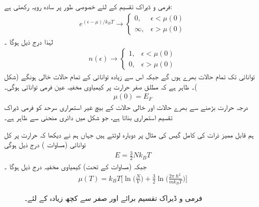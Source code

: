  فرمی و  ڈیراک تقسیم  کے لئے  خصوصی طور پر سادہ رویہ رکھتی ہے: 
\begin{align*}
e^{(\epsilon - \mu)/k_B T} \to
\begin{cases}
0 , & \epsilon < \mu (0) \\
\infty , & \epsilon > \mu (0)
\end{cases}
\end{align*}
لہٰذا درج ذیل ہوگا ۔
\begin{align}
n(\epsilon) \to
\begin{cases}
1, & \epsilon < \mu (0) \\
0, & \epsilon > \mu (0)
\end{cases}
\end{align}
توانائی  تک تمام حالات بھرے ہوں گے جبکہ اس سے زیادہ توانائی کے تمام حالات خالی ہونگے (شکل )۔ ظاہر ہے کہ مطلق صفر حرارت پر کیمیاوی مخفیہ عین فرمی توانائی ہوگی۔ 
\begin{align}
\mu (0) = E_F
\end{align}
درجہ حرارت بڑھنے سے بھرے حالات اور خالی حالات کے بیچ غیر استمراری سرحد کو فرمی ڈیراک تقسیم استمراری بناتا ہے،  جو  شکل   میں دائری منحنی سے ظاہر ہے۔   

ہم قابل ممیز ذرات کی کامل گیس کی مثال پر دوبارہ لوٹتے ہیں جہاں ہم نے دیکھا کہ حرارت  پر کل توانائی  (مساوات  )   درج ذیل ہوگی 
\begin{align}
E = \frac{3}{2} N k_B T
\end{align}
جبکہ (مساوات    کے تحت)  کیمیاوی مخفیہ درج ذیل ہوگا ۔
\begin{align}
\mu (T) = k_B T \big [ \ln\big( \frac{N}{V} \big) + \frac{3}{2} \ln\big ( \frac{2 \pi \hslash^2}{m k_B T} \big ) \big ]
\end{align}

\begin{figure}
\centering
{}
\caption{فرمی و  ڈیراک تقسیم برائے  اور صفر سے کچھ  زیادہ  کے لئے۔}
\label{شکل_متماثل_فرمی_ڈیراک_تقسیم}
\end{figure}

